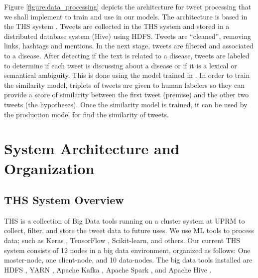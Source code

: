 \documentclass[12pt]{report}
\begin{document}
Figure \ref{figure:data_processing} depicts the architecture for 
tweet processing that we shall implement to train and use in our models. The architecture is based in the THS system \cite{8029348, 8622504}.
Tweets are collected in  the \ac{THS} system and stored in a distributed database system (Hive)  using \ac{HDFS}. Tweets are ``cleaned'', removing links, hashtags and mentions.  
In the next stage, tweets are filtered and associated to a disease. After detecting if the text is related to a disease, tweets are labeled to determine if each tweet is discussing about a disease or if it is a lexical or semantical ambiguity. This is done using the model trained in \cite{8622504}. 
In order to train the similarity model, triplets of tweets are given to human labelers so they can provide a score of similarity between the 
first tweet (premise) and the other two tweets (the hypotheses). 
Once the similarity model is trained, it can be used by the production model for find the similarity of tweets.


\chapter{System Architecture and Organization} \label{chapter 4}
\section{THS System Overview} \label{ths_system}

\ac{THS} is a collection of Big Data tools running on a cluster system at \ac{UPRM} to collect, filter, and store the tweet data to future uses. We use \ac{ML} tools to process data; such as  Keras \cite{Keras2019}, TensorFlow \cite{Tensor2019}, Scikit-learn, and others. Our current \ac{THS} system consists of 12 nodes in a big data environment, organized as follows: One master-node, one client-node, and 10 data-nodes. The big data tools installed are \ac{HDFS} \cite{Hadoop2019}, \ac{YARN} \cite{Hadoop2019}, Apache Kafka \cite{Kafka2019}, Apache Spark \cite{Spark2019}, and Apache Hive \cite{Hive2019}.
\end{document}

